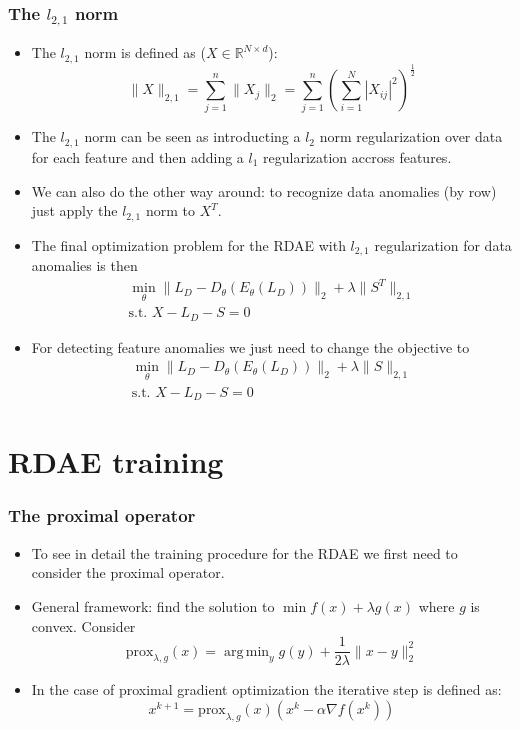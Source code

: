 \documentclass{beamer}
\theoremstyle{plain}
\theoremstyle{definition}
\theoremstyle{remark}
\newcommand{\R}{\mathbb{R}}
\newcommand{\norm}[1]{\lVert#1\rVert}
\newcommand{\prox}{\text{prox}}
\DeclareMathOperator*{\argmin}{arg\,min}
\begin{document}
\begin{frame}
	\frametitle{The $l_{2,1}$ norm}
	\begin{itemize}
		\item The $l_{2,1}$ norm is defined as ($X\in \R^{N\times d}$):
			\begin{equation}
				\norm{X}_{2,1} = \sum_{j=1}^{n}{\norm{X_j}_{2}} = \sum_{j=1}^{n}{\left(\sum_{i=1}^{N}|X_{ij}|^{2}\right)^{\frac{1}{2}}}
			\end{equation}
		\item The $l_{2,1}$ norm can be seen as introducting a $l_2$ norm regularization over data for each feature and then adding a $l_1$ regularization accross features.
		\item We can also do the other way around: to recognize data anomalies (by row) just apply the $l_{2,1}$ norm to $X^T$.
	\end{itemize}
\end{frame}

\begin{frame}
	\begin{itemize}
		\item The final optimization problem for the RDAE with $l_{2,1}$ regularization for data anomalies is then
			\begin{align}
				\min_{\theta}{\norm{L_D -D_{\theta}(E_{\theta}(L_D))}_2 + \lambda\norm{S^T}_{2,1}}\\
				\text{s.t. }X-L_D-S=0  
			\end{align}
		\item For detecting feature anomalies we just need to change the objective to
			\begin{align}
				\min_{\theta}{\norm{L_D -D_{\theta}(E_{\theta}(L_D))}_2 + \lambda\norm{S}_{2,1}}\\
				\text{s.t. }X-L_D-S=0  
			\end{align}
	\end{itemize}
\end{frame}

\section{RDAE training}

\begin{frame}
	\frametitle{The proximal operator}
	\begin{itemize}
		\item To see in detail the training procedure for the RDAE we first need to consider the proximal operator.
		\item General framework: find the solution to $\min f(x)+\lambda g(x)$ where $g$ is convex. Consider
			\begin{equation}
				\prox_{\lambda, g}(x) = \argmin_{y}{g(y)+\frac{1}{2\lambda}\norm{x-y}_{2}^{2}}
			\end{equation}
		\item In the case of proximal gradient optimization the iterative step is defined as:
			\begin{equation}
				x^{k+1} = \prox_{\lambda, g}(x)(x^{k}-\alpha \nabla f(x^{k}))
			\end{equation}
	\end{itemize}
\end{frame}
\end{document}
